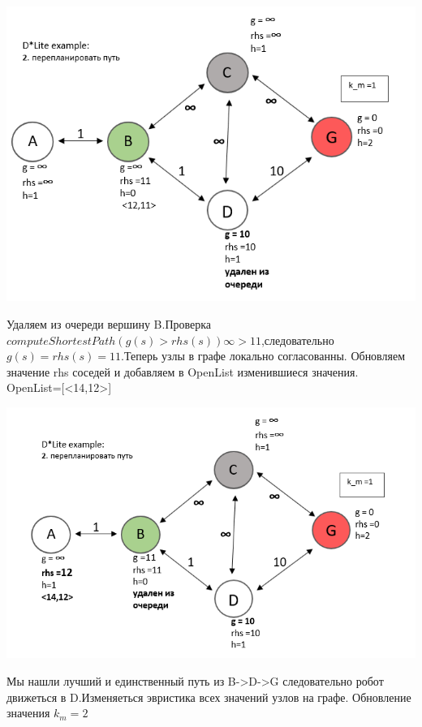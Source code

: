 \documentclass[12pt]{article}
\begin{document}
\begin{center}
         \includegraphics[width=1\textwidth]{img/example5_3.png}
    \end{center}
Удаляем из очереди вершину B.Проверка 
$computeShortestPath(g(s)>rhs(s)) \infty >11 $,следовательно $g(s)=rhs(s)=11$.Теперь узлы в графе локально согласованны. Обновляем значение rhs соседей и добавляем в OpenList изменившиеся значения.\\OpenList=[<14,12>] 
\begin{center}
         \includegraphics[width=1\textwidth]{img/example5_4.png}
    \end{center}
Мы нашли лучший и единственный путь из B->D->G  следовательно робот движеться в D.Изменяеться эвристика всех значений узлов на графе. Обновление значения $k_m=2$
\end{document}
